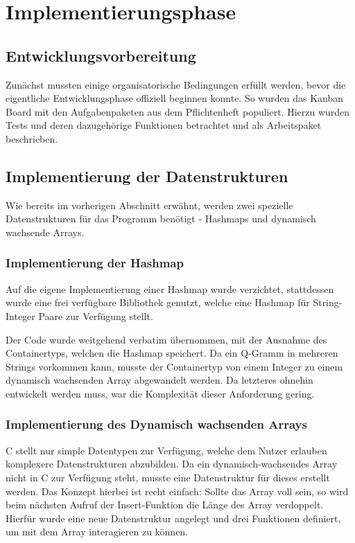 \section{Implementierungsphase}
\label{section:implementierungsphase}
\subsection{Entwicklungsvorbereitung}
Zunächst mussten einige organisatorische Bedingungen erfüllt werden, bevor die eigentliche Entwicklungsphase offiziell beginnen konnte. So wurden das Kanban Board mit den
Aufgabenpaketen aus dem Pflichtenheft populiert. Hierzu wurden Tests und deren
dazugehörige Funktionen betrachtet und als Arbeitspaket beschrieben.

\subsection{Implementierung der Datenstrukturen}
Wie bereits im vorherigen Abschnitt erwähnt, werden zwei spezielle Datenstrukturen für das Programm benötigt - Hashmaps und dynamisch wachsende Arrays.

\subsubsection{Implementierung der Hashmap}


Auf die eigene Implementierung einer Hashmap wurde verzichtet, stattdessen wurde
eine frei verfügbare Bibliothek genutzt, welche eine Hashmap für
String-Integer Paare zur Verfügung stellt.

Der Code wurde weitgehend verbatim übernommen, mit der Ausnahme des
Containertyps, welchen die Hashmap speichert. Da ein Q-Gramm in mehreren Strings
vorkommen kann, musste der Containertyp von einem Integer zu einem dynamisch
wachsenden Array abgewandelt werden. Da letzteres ohnehin entwickelt werden muss,
war die Komplexität dieser Anforderung gering.

\subsubsection{Implementierung des Dynamisch wachsenden Arrays}
C stellt nur simple Datentypen zur Verfügung, welche dem Nutzer erlauben komplexere
Datenstrukturen abzubilden. Da ein dynamisch-wachsendes
Array nicht in C zur Verfügung steht, musste eine Datenstruktur für dieses erstellt werden.
Das Konzept hierbei ist recht einfach: Sollte das Array voll sein, so wird beim
nächsten Aufruf der Insert-Funktion die Länge des Array verdoppelt. Hierfür wurde
eine neue Datenstruktur angelegt und drei Funktionen definiert, um mit dem Array
interagieren zu können.\par
